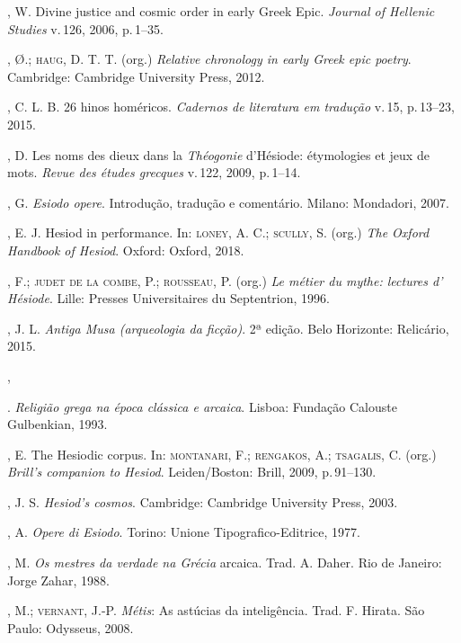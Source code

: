 \begin{bibliohedra}
, W. Divine justice and cosmic order in early Greek Epic.
\textit{Journal of Hellenic Studies} v.\,126, 2006, p.\,1--35.

, Ø.; \textsc{haug}, D. T. T. (org.) \textit{Relative chronology in early
Greek epic poetry}. Cambridge: Cambridge University Press, 2012.

, C. L. B. 26 hinos homéricos. \textit{Cadernos de literatura em
tradução} v.\,15, p.\,13--23, 2015.

, D. Les noms des dieux dans la \textit{Théogonie} d'Hésiode:
étymologies et jeux de mots. \textit{Revue des études grecques} v.\,122,
2009, p.\,1--14.

, G. \textit{Esiodo opere}. Introdução, tradução e comentário.
Milano: Mondadori, 2007.

, E. J. Hesiod in performance. In: \textsc{loney}, A. C.; \textsc{scully}, S. (org.)
\textit{The Oxford Handbook of Hesiod}. Oxford: Oxford, 2018.

, F.; \textsc{judet de la combe}, P.; \textsc{rousseau}, P. (org.) \textit{Le métier
du mythe: lectures d' Hésiode}. Lille: Presses Universitaires du
Septentrion, 1996.

, J. L. \textit{Antiga Musa (arqueologia da ficção)}. 2ª edição.
Belo Horizonte: Relicário, 2015.

, 

\titidem. \textit{Religião grega na época clássica e arcaica}. Lisboa: Fundação
Calouste Gulbenkian, 1993.

, E. The Hesiodic corpus. In: \textsc{montanari}, F.; \textsc{rengakos}, A.;
\textsc{tsagalis}, C. (org.) \textit{Brill's companion to Hesiod}. Leiden/Boston:
Brill, 2009, p.\,91--130.

, J. S. \textit{Hesiod's cosmos}. Cambridge: Cambridge University
Press, 2003.

, A. \textit{Opere di Esiodo}. Torino: Unione Tipografico-Editrice,
1977.

, M. \textit{Os mestres da verdade na Grécia} arcaica. Trad. A.
Daher. Rio de Janeiro: Jorge Zahar, 1988.

, M.; \textsc{vernant}, J.-P. \textit{Métis}: As astúcias da inteligência.
Trad. F. Hirata. São Paulo: Odysseus, 2008.


\end{bibliohedra}
